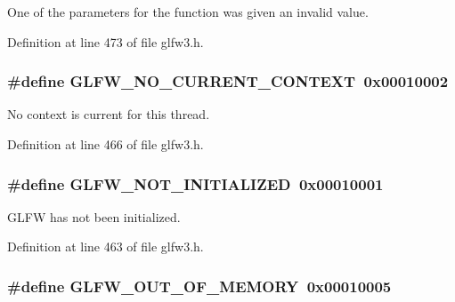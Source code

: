 One of the parameters for the function was given an invalid value. 



Definition at line 473 of file glfw3.\-h.

\hypertarget{group__errors_gaa8290386e9528ccb9e42a3a4e16fc0d0}{
\subsubsection[{G\-L\-F\-W\-\_\-\-N\-O\-\_\-\-C\-U\-R\-R\-E\-N\-T\-\_\-\-C\-O\-N\-T\-E\-X\-T}]{\setlength{\rightskip}{0pt plus 5cm}\#define G\-L\-F\-W\-\_\-\-N\-O\-\_\-\-C\-U\-R\-R\-E\-N\-T\-\_\-\-C\-O\-N\-T\-E\-X\-T~0x00010002}}\label{group__errors_gaa8290386e9528ccb9e42a3a4e16fc0d0}


No context is current for this thread. 



Definition at line 466 of file glfw3.\-h.

\hypertarget{group__errors_ga2374ee02c177f12e1fa76ff3ed15e14a}{
\subsubsection[{G\-L\-F\-W\-\_\-\-N\-O\-T\-\_\-\-I\-N\-I\-T\-I\-A\-L\-I\-Z\-E\-D}]{\setlength{\rightskip}{0pt plus 5cm}\#define G\-L\-F\-W\-\_\-\-N\-O\-T\-\_\-\-I\-N\-I\-T\-I\-A\-L\-I\-Z\-E\-D~0x00010001}}\label{group__errors_ga2374ee02c177f12e1fa76ff3ed15e14a}


G\-L\-F\-W has not been initialized. 



Definition at line 463 of file glfw3.\-h.

\hypertarget{group__errors_ga9023953a2bcb98c2906afd071d21ee7f}{
\subsubsection[{G\-L\-F\-W\-\_\-\-O\-U\-T\-\_\-\-O\-F\-\_\-\-M\-E\-M\-O\-R\-Y}]{\setlength{\rightskip}{0pt plus 5cm}\#define G\-L\-F\-W\-\_\-\-O\-U\-T\-\_\-\-O\-F\-\_\-\-M\-E\-M\-O\-R\-Y~0x00010005}}\label{group__errors_ga9023953a2bcb98c2906afd071d21ee7f}


